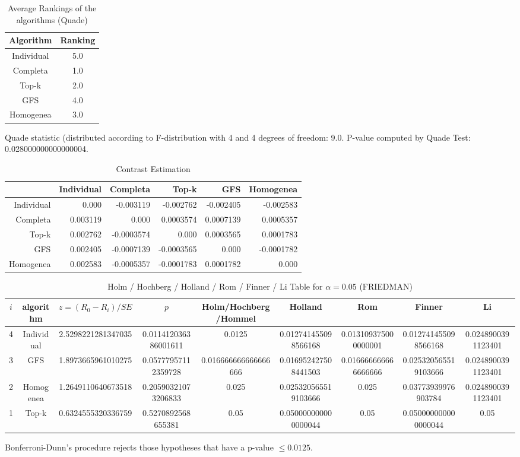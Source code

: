 \documentclass[a4paper,10pt]{article}
\begin{document}
\begin{landscape}
\newpage

\begin{table}[!htp]
\centering
\caption{Average Rankings of the algorithms (Quade)
}\begin{tabular}{c|c}
Algorithm&Ranking\\
\hline
Individual&5.0\\
Completa&1.0\\
Top-k&2.0\\
GFS&4.0\\
Homogenea&3.0\\
\end{tabular}
\end{table}
Quade statistic (distributed according to F-distribution with 4 and 4 degrees of freedom: 9.0. 
P-value computed by Quade Test: 0.028000000000000004.\newline


\newpage

\begin{table}[!htp]
\centering\tiny
\caption{Contrast Estimation}
\begin{tabular}{
|r|r|r|r|r|r|}
\hline
 &Individual&Completa&Top-k&GFS&Homogenea\\
\hline
Individual&0.000&-0.003119&-0.002762&-0.002405&-0.002583\\
\hline
Completa&0.003119&0.000&0.0003574&0.0007139&0.0005357\\
\hline
Top-k&0.002762&-0.0003574&0.000&0.0003565&0.0001783\\
\hline
GFS&0.002405&-0.0007139&-0.0003565&0.000&-0.0001782\\
\hline
Homogenea&0.002583&-0.0005357&-0.0001783&0.0001782&0.000\\
\hline

\end{tabular}
\end{table}

\newpage

\begin{table}[!htp]
\centering\scriptsize
\caption{Holm / Hochberg / Holland / Rom / Finner / Li Table for $\alpha=0.05$ (FRIEDMAN)}
\begin{tabular}{ccccccccc}
$i$&algorithm&$z=(R_0 - R_i)/SE$&$p$&Holm/Hochberg/Hommel&Holland&Rom&Finner&Li\\
\hline
4&Individual&2.5298221281347035&0.011412036386001611&0.0125&0.012741455098566168&0.013109375000000001&0.012741455098566168&0.0248900391123401\\
3&GFS&1.8973665961010275&0.05777957112359728&0.016666666666666666&0.016952427508441503&0.016666666666666666&0.025320565519103666&0.0248900391123401\\
2&Homogenea&1.2649110640673518&0.20590321073206833&0.025&0.025320565519103666&0.025&0.03773939976903784&0.0248900391123401\\
1&Top-k&0.6324555320336759&0.5270892568655381&0.05&0.050000000000000044&0.05&0.050000000000000044&0.05\\
\hline
\end{tabular}
\end{table}
Bonferroni-Dunn's procedure rejects those hypotheses that have a p-value $\le0.0125$.



\end{landscape}
\end{document}
